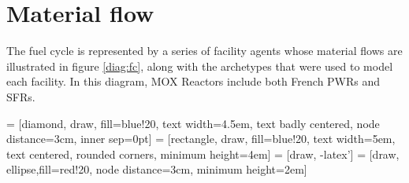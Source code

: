\section{Material flow}

The fuel cycle is represented by a series of facility agents whose material 
flows are illustrated in figure \ref{diag:fc}, along with
the \Cyclus archetypes that were used to model each facility.
In this diagram, \gls{MOX} Reactors include both French \glspl{PWR} and 
\glspl{SFR}.

 = [diamond, draw, fill=blue!20, 
text width=4.5em, text badly centered, node distance=3cm, inner sep=0pt]
 = [rectangle, draw, fill=blue!20, 
text width=5em, text centered, rounded corners, minimum height=4em]
 = [draw, -latex']
 = [draw, ellipse,fill=red!20, node distance=3cm,
minimum height=2em]


